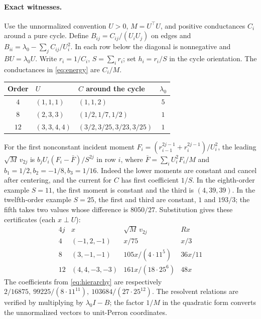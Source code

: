 \documentclass[11pt]{article}
\begin{document}
\paragraph{Exact witnesses.}
Use the unnormalized convention \(U>0\), \(M=U^\top U\), and positive
conductances \(C_i\) around a pure cycle. Define
\(B_{ij}=C_{ij}/(U_iU_j)\) on edges and
\(B_{ii}=\lambda_0-\sum_j C_{ij}/U_i^2\).
In each row below the diagonal is nonnegative and \(BU=\lambda_0U\).
Write \(r_i=1/C_i\), \(S=\sum_i r_i\); set \(h_i=r_i/S\) in the
cycle orientation. The conductances in \eqref{eq:energy} are \(C_i/M\).
\begin{center}
\small
\begin{tabular}{@{}cllc@{}}
\toprule
Order & \(U\) & \(C\) around the cycle & \(\lambda_0\)\\
\midrule
\(4\)  & \((1,1,1)\) & \((1,1,2)\) & \(5\)\\
\(8\)  & \((2,3,3)\) & \((1/2,1/7,1/2)\) & \(1\)\\
\(12\) & \((3,3,4,4)\) & \((3/2,3/25,3/23,3/25)\) & \(1\)\\
\bottomrule
\end{tabular}
\end{center}
For the first nonconstant incident moment
\(F_i=(r_{i-1}^{2j-1}+r_i^{2j-1})/U_i^2\), the leading
\(\sqrt M\,v_{2j}\) is \(b_j U_i(F_i-\bar F)/S^{2j}\) in row \(i\),
where \(\bar F=\sum_i U_i^2 F_i/M\) and
\(b_1=1/2,b_2=-1/8,b_3=1/16\).
Indeed the lower moments are constant and cancel after centering,
and the current for \(C\) has first coefficient \(1/S\).
In the eighth-order example \(S=11\), the first moment is constant and
the third is \((4,39,39)\). In the twelfth-order example \(S=25\),
the first and third are constant, \(1\) and \(193/3\); the fifth
takes two values whose difference is \(8050/27\).
Substitution gives these certificates (each \(x\perp U\)):
\[
\begin{array}{c|c|c|c}
 4j & x & \sqrt M\,v_{2j} & Rx\\ \hline
 4 & (-1,2,-1) & x/75 & x/3\\
 8 & (3,-1,-1) & 105x/(4\cdot11^5) & 36x/11\\
 12 & (4,4,-3,-3) & 161x/(18\cdot25^6) & 48x
\end{array}
\]
The coefficients from \eqref{eq:hierarchy} are respectively
\(2/16875,\ 99225/(8\cdot11^{11}),\ 103684/(27\cdot25^{12})\).
The resolvent relations are verified by multiplying by
\(\lambda_0 I-B\); the factor \(1/M\) in the quadratic form converts
the unnormalized vectors to unit-Perron coordinates.
\end{document}
